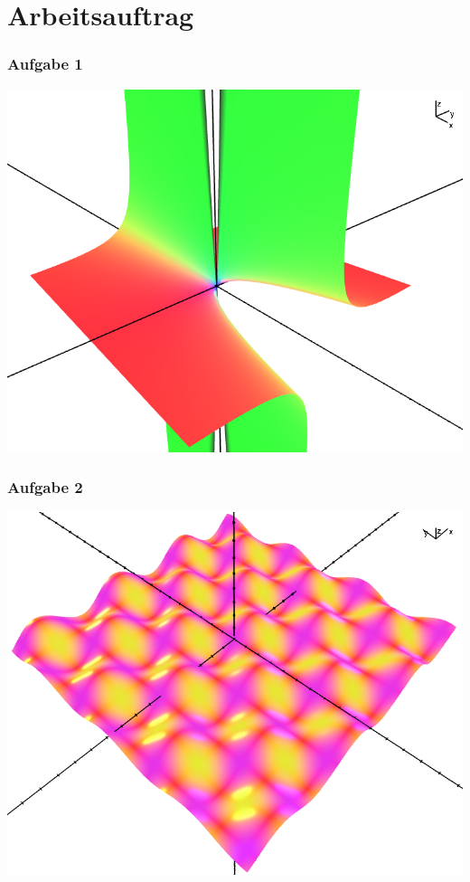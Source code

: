 \documentclass{beamer}
\begin{document}
\section{Arbeitsauftrag}
\begin{frame}\frametitle{Aufgabe 1}
\includegraphics[height=0.7\textheight]{images/graphs/x_divide_y.png}
\end{frame}
\begin{frame}\frametitle{Aufgabe 2}
 \includegraphics[height=0.7\textheight]{images/graphs/sin_cos.png}
\end{frame}
\end{document}
